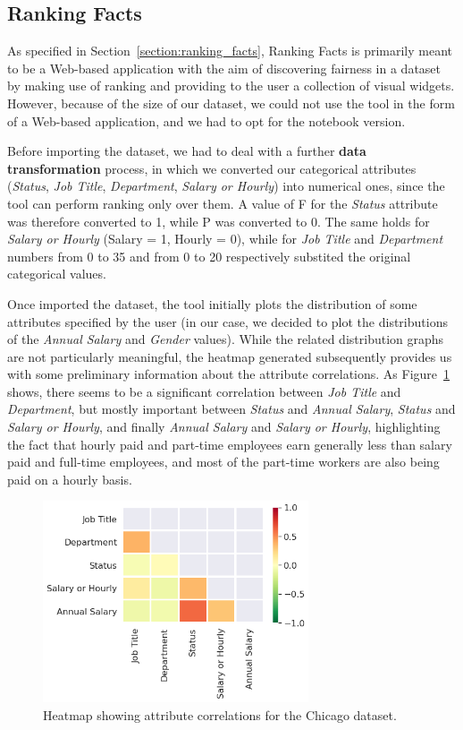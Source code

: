 \subsection{Ranking Facts}
As specified in Section~\ref{section:ranking_facts}, Ranking Facts is primarily meant to be a Web-based application with the aim of discovering fairness in a dataset by making use of ranking and providing to the user a collection of visual widgets. However, because of the size of our dataset, we could not use the tool in the form of a Web-based application, and we had to opt for the notebook version.

Before importing the dataset, we had to deal with a further \textbf{data transformation} process, in which we converted our categorical attributes (\textit{Status}, \textit{Job Title}, \textit{Department}, \textit{Salary or Hourly}) into numerical ones, since the tool can perform ranking only over them. A value of F for the \textit{Status} attribute was therefore converted to 1, while P was converted to 0. The same holds for \textit{Salary or Hourly} (Salary = 1, Hourly = 0), while for \textit{Job Title} and \textit{Department} numbers from 0 to 35 and from 0 to 20 respectively substited the original categorical values.

Once imported the dataset, the tool initially plots the distribution of some attributes specified by the user (in our case, we decided to plot the distributions of the \textit{Annual Salary} and \textit{Gender} values). While the related distribution graphs are not particularly meaningful, the heatmap generated subsequently provides us with some preliminary information about the attribute correlations. As Figure~\ref{fig:chicago_rankingfacts1} shows, there seems to be a significant correlation between \textit{Job Title} and \textit{Department}, but mostly important between \textit{Status} and \textit{Annual Salary}, \textit{Status} and \textit{Salary or Hourly}, and finally \textit{Annual Salary} and \textit{Salary or Hourly}, highlighting the fact that hourly paid and part-time employees earn generally less than salary paid and full-time employees, and most of the part-time workers are also being paid on a hourly basis.

\begin{figure}[t!]
\centering
\includegraphics[width=0.7\textwidth]{figures/chicago_rankingfacts1.png}
\caption{Heatmap showing attribute correlations for the Chicago dataset.}
\label{fig:chicago_rankingfacts1}
\end{figure}

